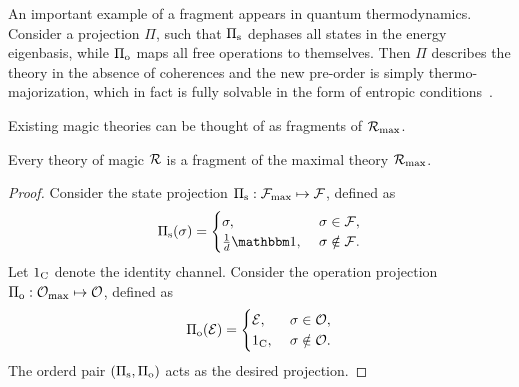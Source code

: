 An important example of a fragment appears in quantum thermodynamics. 
Consider a projection $\Pi$, such that $\Pi_{\rm{s}}$ dephases all states in the energy eigenbasis, while $\Pi_{\rm{o}}$ maps all free operations to themselves.
Then $\Pi$ describes the theory in the absence of coherences and the new pre-order is simply thermo-majorization, which in fact is fully solvable in the form of entropic conditions~\cite{cit:gour}. 

Existing magic theories can be thought of as fragments of $\mathcal{R}_{\rm{}max}$.
\begin{proposition}
    Every theory of magic $\mathcal{R}$ is a fragment of the maximal theory $\mathcal{R}_{\rm{}max}$.
\end{proposition}
\begin{proof}
    Consider the state projection $\Pi_{\rm{s}}:\mathcal{F}_{\rm{max}} \mapsto \mathcal{F}$, defined as
    \begin{equation}
    \Pis(\sigma) =
    \begin{cases}
        \sigma,\ &\sigma \in \F, \\
        \frac{1}{d}\id,\ &\sigma \notin \F.
    \end{cases}
    \end{equation}
    Let $1_{\rm{C}}$ denote the identity channel.
    Consider the operation projection $\Pi_{\rm{o}}:\mathcal{O}_{\rm{}max} \mapsto \mathcal{O}$, defined as
    \begin{equation}
    \Pi_{\rm{o}}(\mathcal{E}) =
    \begin{cases}
        \mathcal{E},\ &\sigma \in \mathcal{O}, \\
        1_{\rm{C}},\ &\sigma \notin \mathcal{O}.
    \end{cases}
    \end{equation}
    The orderd pair $(\Pi_{\rm{s}}, \Pi_{\rm{o}})$ acts as the desired projection.
\end{proof}